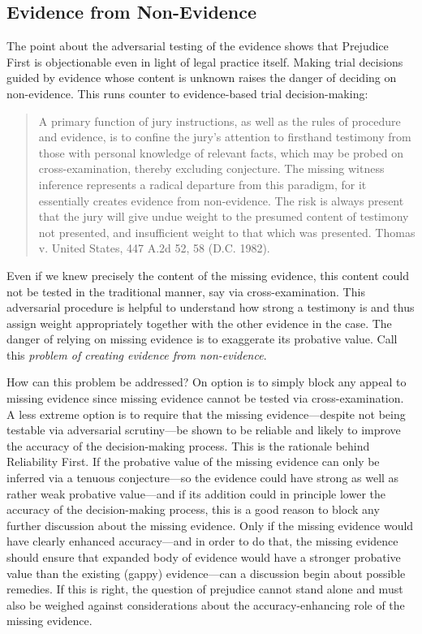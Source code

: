 \documentclass[
  10pt,
  dvipsnames,enabledeprecatedfontcommands]{scrartcl}
\begin{document}
\hypertarget{evidence-from-non-evidence}{%
\subsection{Evidence from
Non-Evidence}\label{evidence-from-non-evidence}}

The point about the adversarial testing of the evidence shows that
Prejudice First is objectionable even in light of legal practice itself.
Making trial decisions guided by evidence whose content is unknown
raises the danger of deciding on non-evidence. This runs counter to
evidence-based trial decision-making:

\begin{quote}
A primary function of jury instructions, as well as the rules of
procedure and evidence, is to confine the jury's attention to firsthand
testimony from those with personal knowledge of relevant facts, which
may be probed on cross-examination, thereby excluding conjecture. The
missing witness inference represents a radical departure from this
paradigm, for it essentially creates evidence from non-evidence. The
risk is always present that the jury will give undue weight to the
presumed content of testimony not presented, and insufficient weight to
that which was presented. Thomas v. United States, 447 A.2d 52, 58 (D.C.
1982).
\end{quote}

\noindent Even if we knew precisely the content of the missing evidence,
this content could not be tested in the traditional manner, say via
cross-examination. This adversarial procedure is helpful to understand
how strong a testimony is and thus assign weight appropriately together
with the other evidence in the case. The danger of relying on missing
evidence is to exaggerate its probative value. Call this \emph{problem
of creating evidence from non-evidence}.

How can this problem be addressed? On option is to simply block any
appeal to missing evidence since missing evidence cannot be tested via
cross-examination. A less extreme option is to require that the missing
evidence---despite not being testable via adversarial scrutiny---be
shown to be reliable and likely to improve the accuracy of the
decision-making process. This is the rationale behind Reliability First.
If the probative value of the missing evidence can only be inferred via
a tenuous conjecture---so the evidence could have strong as well as
rather weak probative value---and if its addition could in principle
lower the accuracy of the decision-making process, this is a good reason
to block any further discussion about the missing evidence. Only if the
missing evidence would have clearly enhanced accuracy---and in order to
do that, the missing evidence should ensure that expanded body of
evidence would have a stronger probative value than the existing (gappy)
evidence---can a discussion begin about possible remedies. If this is
right, the question of prejudice cannot stand alone and must also be
weighed against considerations about the accuracy-enhancing role of the
missing evidence.
\end{document}
